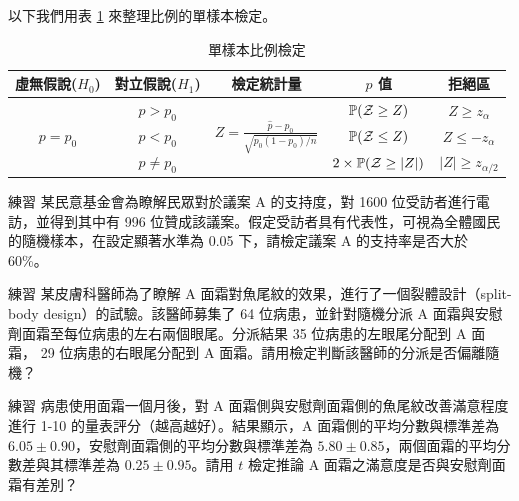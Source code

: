     以下我們用表 \ref{tab:one_sample_proportion} 來整理比例的單樣本檢定。

    \begin{table}[htbp]
        \begin{center}
            \begin{tabular}{ccccc}
                \toprule
                虛無假說($H_0$) & 對立假說($H_1$) & 檢定統計量 & $p$ 值 & 拒絕區\\
                \hline
                \multirow{3}{*}{$p = p_0$} & $p > p_0$ & \multirow{3}{*}{$Z = \frac{\hat{p}-p_0}{\sqrt{p_0(1-p_0)/n}}$} & $\mathbb{P}(\mathcal{Z} \ge Z)$ & $Z \ge z_{\alpha}$\\
                & $p < p_0$ & &$\mathbb{P}(\mathcal{Z} \le Z)$&$Z \le -z_{\alpha}$\\
                & $p \ne p_0$ & &$2\times\mathbb{P}(\mathcal{Z} \ge |Z|)$&$|Z| \ge z_{\alpha/2}$\\
                \bottomrule
            \end{tabular}
            \caption{單樣本比例檢定\label{tab:one_sample_proportion}}
        \end{center}
    \end{table}

    \begin{custom}{練習}
        某民意基金會為瞭解民眾對於議案 A 的支持度，對 1600 位受訪者進行電訪，並得到其中有 996 位贊成該議案。假定受訪者具有代表性，可視為全體國民的隨機樣本，在設定顯著水準為 0.05 下，請檢定議案 A 的支持率是否大於 60\%。
    \end{custom}

    \bigskip

    \begin{custom}{練習}
        某皮膚科醫師為了瞭解 A 面霜對魚尾紋的效果，進行了一個裂體設計（split-body design）的試驗。該醫師募集了 64 位病患，並針對隨機分派 A 面霜與安慰劑面霜至每位病患的左右兩個眼尾。分派結果 35 位病患的左眼尾分配到 A 面霜， 29 位病患的右眼尾分配到 A 面霜。請用檢定判斷該醫師的分派是否偏離隨機？
    \end{custom}

    \bigskip

    \begin{custom}{練習}
        病患使用面霜一個月後，對 A 面霜側與安慰劑面霜側的魚尾紋改善滿意程度進行 1-10 的量表評分（越高越好）。結果顯示，A 面霜側的平均分數與標準差為 $6.05 \pm 0.90$，安慰劑面霜側的平均分數與標準差為 $5.80 \pm 0.85$，兩個面霜的平均分數差與其標準差為 $0.25 \pm 0.95$。請用 $t$ 檢定推論 A 面霜之滿意度是否與安慰劑面霜有差別？
    \end{custom}

